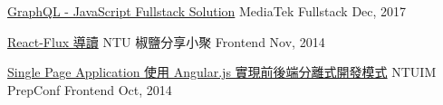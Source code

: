 
\begin{cvhonors}

  \cvhonor
    {\href{https://speakerdeck.com/evenchange4/graphql-javascript-fullstack-solution}{GraphQL - JavaScript Fullstack Solution}} %
    {MediaTek} %
    {Fullstack} %
    {Dec, 2017} %

  \cvhonor
    {\href{https://slides.com/evenchange4/react-flux-intro}{React-Flux 導讀}} %
    {NTU 椒鹽分享小聚} %
    {Frontend} %
    {Nov, 2014} %

  \cvhonor
    {\href{https://slides.com/evenchange4/2014-ntuim-prepconf}{Single Page Application 使用 Angular.js 實現前後端分離式開發模式}} %
    {NTUIM PrepConf} %
    {Frontend} %
    {Oct, 2014} %

\end{cvhonors}
